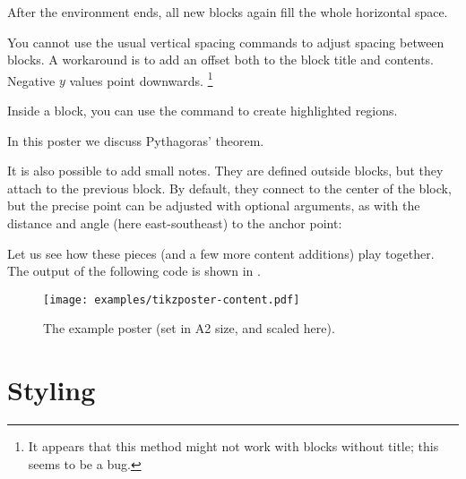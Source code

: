 After the  environment ends,
all new blocks again fill the whole horizontal space.

You cannot use the usual vertical spacing commands to adjust spacing between blocks.
A workaround is to add an offset both to the block title and contents.
Negative $y$ values point downwards.%
\footnote{It appears that this method might not work with blocks without title;
this seems to be a bug.}
%
\begin{ExampleCode}
\end{ExampleCode}

Inside a block, you can use the  command to create highlighted regions.
%
\begin{ExampleCode}
{
In this poster we discuss Pythagoras' theorem.


}
\end{ExampleCode}
%
It is also possible to add small notes.
They are defined outside blocks, but they attach to the previous block.
By default, they connect to the center of the block,
but the precise point can be adjusted with optional arguments,
as with the distance and angle (here east-southeast) to the anchor point:
%
\begin{ExampleCode}
\end{ExampleCode}

Let us see how these pieces (and a few more content additions) play together.
The output of the following code is shown in .

\begin{figure}
\centering
\texttt{[image: examples/tikzposter-content.pdf]}
\caption{The example poster (set in A2 size, and scaled here).}\label{fig:poster example}
\end{figure}





%
%
\section{Styling}\label{sec:poster style}

